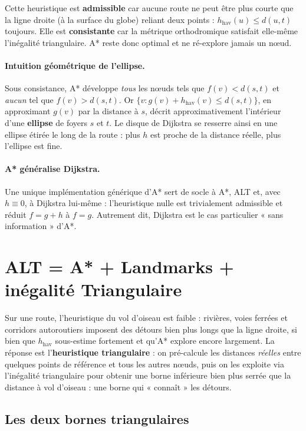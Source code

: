 \medskip

Cette heuristique est \textbf{admissible} car aucune route ne peut être plus
courte que la ligne droite (à la surface du globe) reliant deux points :
$h_{\text{hav}}(u) \le d(u,t)$ toujours. Elle est \textbf{consistante} car la
métrique orthodromique satisfait elle-même l'inégalité triangulaire. A* reste
donc optimal et ne ré-explore jamais un nœud.

\paragraph{Intuition géométrique de l'ellipse.} Sous consistance, A* développe
\emph{tous} les nœuds tels que $f(v) < d(s,t)$ et \emph{aucun} tel que
$f(v) > d(s,t)$. Or $\{v : g(v) + h_{\text{hav}}(v) \le d(s,t)\}$, en
approximant $g(v)$ par la distance à $s$, décrit approximativement l'intérieur
d'une \textbf{ellipse} de foyers $s$ et $t$. Le disque de Dijkstra se resserre
ainsi en une ellipse étirée le long de la route : plus $h$ est proche de la
distance réelle, plus l'ellipse est fine.

\paragraph{A* généralise Dijkstra.}
Une unique implémentation générique d'A* sert de socle à A*, ALT et, avec
$h \equiv 0$, à Dijkstra lui-même : l'heuristique nulle est trivialement
admissible et réduit $f = g + h$ à $f = g$. Autrement dit, Dijkstra est le cas
particulier « sans information » d'A*.

\section{ALT = A* + Landmarks + inégalité Triangulaire}
\label{sec:alt}

Sur une route, l'heuristique du vol d'oiseau est faible : rivières, voies ferrées
et corridors autoroutiers imposent des détours bien plus longs que la ligne
droite, si bien que $h_{\text{hav}}$ sous-estime fortement et qu'A* explore
encore largement. La réponse est l'\textbf{heuristique triangulaire}
\citep{goldberg2005alt} : on pré-calcule les distances \emph{réelles} entre
quelques points de référence et tous les autres nœuds, puis on les exploite via
l'inégalité triangulaire pour obtenir une borne inférieure bien plus serrée que
la distance à vol d'oiseau : une borne qui « connaît » les détours.

\subsection{Les deux bornes triangulaires}
\label{sec:alt-bornes}

